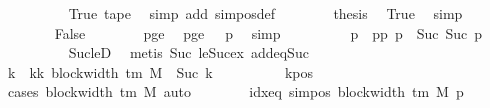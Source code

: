 \begin{isabellebody}
\ \ \ \ \ \ \ \ \isamarkupfalse%
\ True\ tape{}\ \isamarkupfalse%
\ {\isacharparenleft}{\kern0pt}simp\ add{\isacharcolon}{\kern0pt}\ sim{\isacharunderscore}{\kern0pt}pos{\isacharunderscore}{\kern0pt}def{\isacharparenright}{\kern0pt}\isanewline
\ \ \ \ \ \ \isamarkupfalse%
\ {\isacharquery}{\kern0pt}thesis\ \isamarkupfalse%
\ True\ \isamarkupfalse%
\ simp\isanewline
\ \ \ \ \isamarkupfalse%
\isanewline
\ \ \ \ \ \ \isamarkupfalse%
\ False\isanewline
\ \ \ \ \ \ \isamarkupfalse%
\ pge{}\ \isamarkupfalse%
\ pge{}{\isacharcolon}{\kern0pt}\ {\isachardoublequoteopen}{}\ {\isasymle}\ p{\isachardoublequoteclose}\ \isamarkupfalse%
\ simp\isanewline
\ \ \ \ \ \ \isamarkupfalse%
\ \isamarkupfalse%
\ p{}\ \ pp{\isacharcolon}{\kern0pt}\ {\isachardoublequoteopen}p\ {\isacharequal}{\kern0pt}\ Suc\ {\isacharparenleft}{\kern0pt}Suc\ p{}{\isacharparenright}{\kern0pt}{\isachardoublequoteclose}\isanewline
\ \ \ \ \ \ \ \ \isamarkupfalse%
\ Suc{\isacharunderscore}{\kern0pt}le{\isacharunderscore}{\kern0pt}D\ \isamarkupfalse%
\ {\isacharparenleft}{\kern0pt}metis\ Suc{\isacharunderscore}{\kern0pt}{}\ le{\isacharunderscore}{\kern0pt}Suc{\isacharunderscore}{\kern0pt}ex\ add{\isacharunderscore}{\kern0pt}{}{\isacharunderscore}{\kern0pt}eq{\isacharunderscore}{\kern0pt}Suc{\isacharparenright}{\kern0pt}\isanewline
\ \ \ \ \ \ \isamarkupfalse%
\ k{}\ \ kk{\isacharcolon}{\kern0pt}\ {\isachardoublequoteopen}block{\isacharunderscore}{\kern0pt}width\ {\isacharparenleft}{\kern0pt}{\isasymGamma}{\isacharunderscore}{\kern0pt}tm\ M{\isacharparenright}{\kern0pt}\ {\isacharequal}{\kern0pt}\ Suc\ k{}{\isachardoublequoteclose}\isanewline
\ \ \ \ \ \ \ \ \isamarkupfalse%
\ kpos\ \isamarkupfalse%
\ {\isacharparenleft}{\kern0pt}cases\ {\isachardoublequoteopen}block{\isacharunderscore}{\kern0pt}width\ {\isacharparenleft}{\kern0pt}{\isasymGamma}{\isacharunderscore}{\kern0pt}tm\ M{\isacharparenright}{\kern0pt}{\isachardoublequoteclose}{\isacharparenright}{\kern0pt}\ auto\isanewline
\ \ \ \ \ \ \isamarkupfalse%
\ idx{\isacharunderscore}{\kern0pt}eq{\isacharcolon}{\kern0pt}\ {\isachardoublequoteopen}sim{\isacharunderscore}{\kern0pt}pos\ {\isacharparenleft}{\kern0pt}block{\isacharunderscore}{\kern0pt}width\ {\isacharparenleft}{\kern0pt}{\isasymGamma}{\isacharunderscore}{\kern0pt}tm\ M{\isacharparenright}{\kern0pt}{\isacharparenright}{\kern0pt}\ p\ {\isacharminus}{\kern0pt}\ {}\isanewline

\end{isabellebody}
